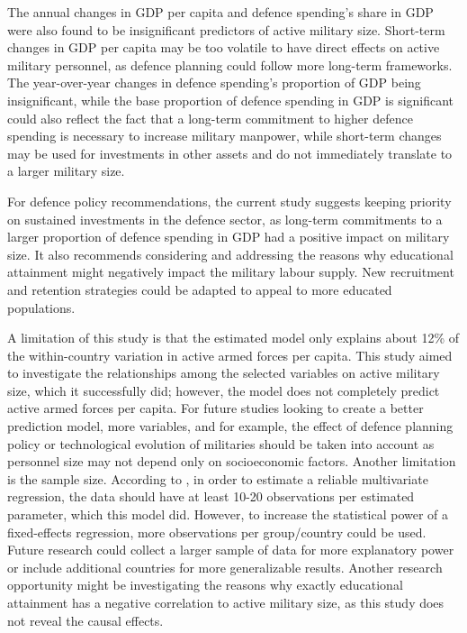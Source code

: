 The annual changes in GDP per capita and defence spending's share in GDP were also found to be 
insignificant predictors of active military size. Short-term changes in GDP per capita may be 
too volatile to have direct effects on active military personnel, as defence planning could 
follow more long-term frameworks. The year-over-year changes in defence spending's proportion 
of GDP being insignificant, while the base proportion of defence spending in GDP is significant 
could also reflect the fact that a long-term commitment to higher defence spending is 
necessary to increase military manpower, while short-term changes may be used for
investments in other assets and do not immediately translate to a larger military size.

For defence policy recommendations, the current study suggests keeping priority on sustained 
investments in the defence sector, as long-term commitments to a larger proportion of defence 
spending in GDP had a positive impact on military size. It also recommends considering and 
addressing the reasons why educational attainment might negatively impact the military labour supply. 
New recruitment and retention strategies could be adapted to appeal to more educated 
populations.

A limitation of this study is that the estimated model only explains about 12\% of the within-country 
variation in active armed forces per capita. 
This study aimed to investigate the relationships among the selected variables on 
active military size, which it successfully did; however, the model does not completely predict 
active armed forces per capita. For future studies looking to create a better prediction model, 
more variables, and for example, the effect of defence planning policy or technological evolution of militaries 
should be taken into account as 
personnel size may not depend only on socioeconomic factors.
Another limitation is the sample size. According to \textcite{harrell_multivariable_2015},
in order to estimate a reliable multivariate regression, the data should have at least 
10-20 observations per estimated parameter, which this model did. 
However, to increase the statistical 
power of a fixed-effects regression, more observations per group/country could be used.
Future research could collect a larger sample of data for more explanatory power or 
include additional countries for more generalizable results.
Another research opportunity might be investigating the reasons why exactly educational 
attainment has a negative correlation to active military size, as this study does not reveal 
the causal effects.

